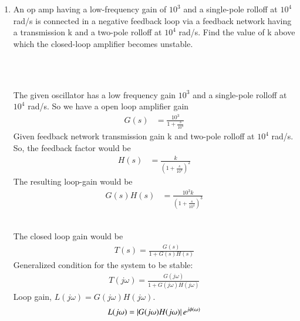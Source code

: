 
\begin{enumerate}[label=\thesection.\arabic*.,ref=\thesection.\theenumi]

\item An op amp having a low-frequency gain of $10^{3}$ and a single-pole rolloff at $10^{4}$ rad/s is connected in a negative feedback loop via a feedback network having a transmission k and a two-pole rolloff at $10^{4}$ rad/s. Find the value of k above which the closed-loop amplifier becomes unstable.

\\
\solution \newline
\begin{figure}[!ht]
	\begin{center}
		\resizebox{\columnwidth}{!}{}
	\end{center}
\caption{}
\label{fig:ee18btech11006_1}
\end{figure} \\
The given oscillator has a low frequency gain $10^3$ and a single-pole rolloff at $10^4$ rad/s. So we have a open loop amplifier gain 
\begin{align}
G(s)&= \frac{10^3}{1+\frac{s}{10^4}}
\end{align}
Given feedback network transmission gain k and two-pole rolloff at $10^4$ rad/s. So, the feedback factor would be
\begin{align}
H(s)&= \frac{k}{\left(1+\frac{s}{10^4}\right)^2}   
\end{align}
The resulting loop-gain would be 
\begin{align}
G(s)H(s) &= \frac{10^3k}{\left(1+\frac{s}{10^4}\right)^3}
\end{align}
\begin{table}[!ht]
\centering

\caption{}
\label{table:ee18btech11006_Factors}
\end{table}\\
The closed loop gain would be
\begin{align}
T(s)=\frac{G(s)}{1+G(s)H(s)}
\end{align}
Generalized condition for the system to be stable:
\begin{align}
T(j\omega)=\frac{G(j\omega)}{1+G(j\omega)H(j\omega)}
\end{align}
Loop gain, $L(j\omega)=G(j\omega)H(j\omega)$.
\begin{align}
L(j\omega)=\abs{{G(j\omega)H(j\omega)}}e^{j\phi(\omega)}

\end{align}
\end{enumerate}
